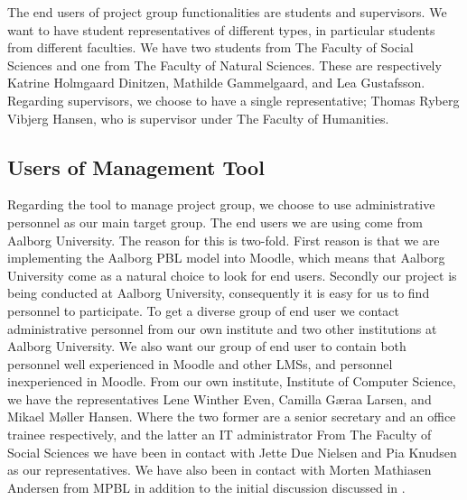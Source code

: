 The end users of project group functionalities are students and supervisors.
We want to have student representatives of different types, in particular students from different faculties.
We have two students from The Faculty of Social Sciences and one from The Faculty of Natural Sciences.
These are respectively Katrine Holmgaard Dinitzen, Mathilde Gammelgaard, and Lea Gustafsson.
Regarding supervisors, we choose to have a single representative; Thomas Ryberg Vibjerg Hansen, who is supervisor under The Faculty of Humanities.

\subsection{Users of Management Tool}
\label{sub:enduserstool}
Regarding the tool to manage project group, we choose to use administrative personnel as our main target group.
The end users we are using come from Aalborg University.
The reason for this is two-fold.
First reason is that we are implementing the Aalborg PBL model into Moodle, which means that Aalborg University come as a natural choice to look for end users.
Secondly our project is being conducted at Aalborg University, consequently it is easy for us to find personnel to participate.
To get a diverse group of end user we contact administrative personnel from our own institute and two other institutions at Aalborg University.
We also want our group of end user to contain both personnel well experienced in Moodle and other LMSs, and personnel inexperienced in Moodle.
From our own institute, Institute of Computer Science, we have the representatives Lene Winther Even, Camilla G\ae{}raa Larsen, and Mikael M\o{}ller Hansen.
Where the two former are a senior secretary and an office trainee respectively, and the latter an IT administrator
From The Faculty of Social Sciences we have been in contact with  Jette Due Nielsen and Pia Knudsen as our representatives.
We have also been in contact with Morten Mathiasen Andersen from MPBL in addition to the initial discussion discussed in .

\begin{comment}

\begin{figure}
	\centering
		\begin{tabular}{|p{0.5\textwidth}|p{0.5\textwidth}|}
			\hline
			\textbf{Members of Project Group} & \textbf{Users of Management Tool}\\
			\hline
			Students from different faculties and a supervisor & Secretaries from different faculties and an IT administrator.\\
			\hline
		\end{tabular}
	\morscaption{The group of end users divided accordingly to the two main aspects of our \subsystem{}}
	\label{fig:endusers}
\end{figure}

\end{comment}